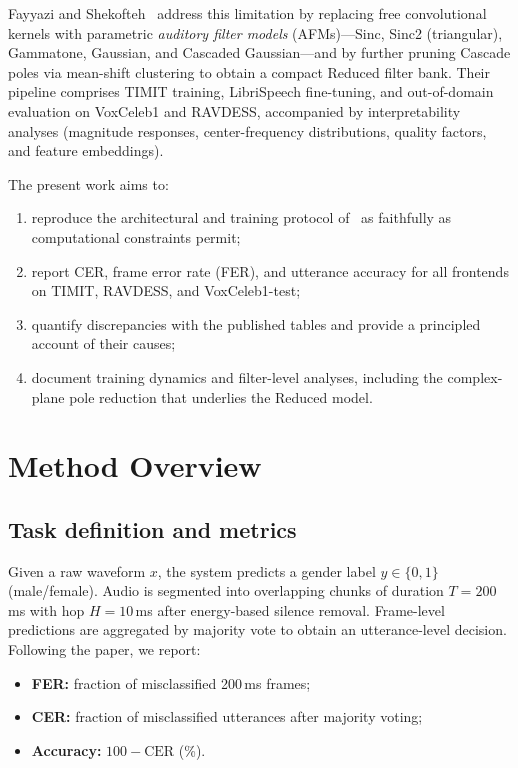 \documentclass[11pt,a4paper]{article}
\begin{document}
Fayyazi and Shekofteh~\cite{fayyazi2023} address this limitation by replacing free convolutional kernels with parametric \emph{auditory filter models} (AFMs)---Sinc, Sinc2 (triangular), Gammatone, Gaussian, and Cascaded Gaussian---and by further pruning Cascade poles via mean-shift clustering to obtain a compact Reduced filter bank. Their pipeline comprises TIMIT training, LibriSpeech fine-tuning, and out-of-domain evaluation on VoxCeleb1 and RAVDESS, accompanied by interpretability analyses (magnitude responses, center-frequency distributions, quality factors, and feature embeddings).

The present work aims to:
\begin{enumerate}[leftmargin=1.6em,itemsep=0.25em]
  \item reproduce the architectural and training protocol of~\cite{fayyazi2023} as faithfully as computational constraints permit;
  \item report CER, frame error rate (FER), and utterance accuracy for all frontends on TIMIT, RAVDESS, and VoxCeleb1-test;
  \item quantify discrepancies with the published tables and provide a principled account of their causes;
  \item document training dynamics and filter-level analyses, including the complex-plane pole reduction that underlies the Reduced model.
\end{enumerate}

\section{Method Overview}

\subsection{Task definition and metrics}

Given a raw waveform $x$, the system predicts a gender label $y\in\{0,1\}$ (male/female). Audio is segmented into overlapping chunks of duration $T{=}200$\,ms with hop $H{=}10$\,ms after energy-based silence removal. Frame-level predictions are aggregated by majority vote to obtain an utterance-level decision. Following the paper, we report:
\begin{itemize}[leftmargin=1.6em,itemsep=0.2em]
  \item \textbf{FER:} fraction of misclassified 200\,ms frames;
  \item \textbf{CER:} fraction of misclassified utterances after majority voting;
  \item \textbf{Accuracy:} $100-\mathrm{CER}$ (\%).
\end{itemize}
\end{document}
